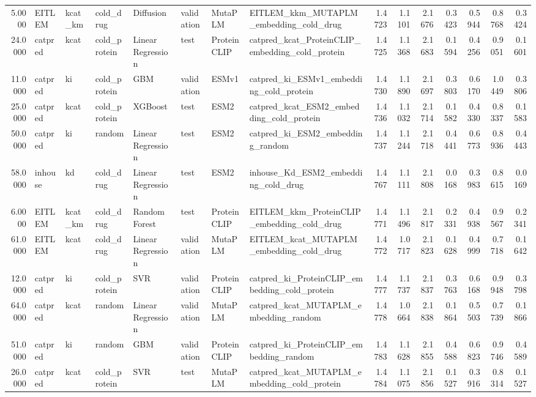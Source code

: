 \begin{tabular}{rlllllllrrrrrrr}
5.0000 & EITLEM & kcat_km & cold_drug & Diffusion & validation & MutaPLM & EITLEM_kkm_MUTAPLM_embedding_cold_drug & 1.4723 & 1.1101 & 2.1676 & 0.3423 & 0.5944 & 0.8768 & 0.3424 \\
24.0000 & catpred & kcat & cold_protein & Linear Regression & test & ProteinCLIP & catpred_kcat_ProteinCLIP_embedding_cold_protein & 1.4725 & 1.1368 & 2.1683 & 0.1594 & 0.4256 & 0.9051 & 0.1601 \\
11.0000 & catpred & ki & cold_protein & GBM & validation & ESMv1 & catpred_ki_ESMv1_embedding_cold_protein & 1.4730 & 1.1890 & 2.1697 & 0.3803 & 0.6170 & 1.0449 & 0.3806 \\
25.0000 & catpred & kcat & cold_protein & XGBoost & test & ESM2 & catpred_kcat_ESM2_embedding_cold_protein & 1.4736 & 1.1032 & 2.1714 & 0.1582 & 0.4330 & 0.8337 & 0.1583 \\
50.0000 & catpred & ki & random & Linear Regression & test & ESM2 & catpred_ki_ESM2_embedding_random & 1.4737 & 1.1244 & 2.1718 & 0.4441 & 0.6773 & 0.8936 & 0.4443 \\
58.0000 & inhouse & kd & cold_drug & Linear Regression & test & ESM2 & inhouse_Kd_ESM2_embedding_cold_drug & 1.4767 & 1.1111 & 2.1808 & 0.0168 & 0.3983 & 0.8615 & 0.0169 \\
6.0000 & EITLEM & kcat_km & cold_drug & Random Forest & test & ProteinCLIP & EITLEM_kkm_ProteinCLIP_embedding_cold_drug & 1.4771 & 1.1496 & 2.1817 & 0.2331 & 0.4938 & 0.9567 & 0.2341 \\
61.0000 & EITLEM & kcat & cold_drug & Linear Regression & validation & MutaPLM & EITLEM_kcat_MUTAPLM_embedding_cold_drug & 1.4772 & 1.0717 & 2.1823 & 0.1628 & 0.4999 & 0.7718 & 0.1642 \\
12.0000 & catpred & ki & cold_protein & SVR & validation & ProteinCLIP & catpred_ki_ProteinCLIP_embedding_cold_protein & 1.4777 & 1.1737 & 2.1837 & 0.3763 & 0.6168 & 0.9948 & 0.3798 \\
64.0000 & catpred & kcat & random & Linear Regression & validation & MutaPLM & catpred_kcat_MUTAPLM_embedding_random & 1.4778 & 1.0664 & 2.1838 & 0.1864 & 0.5503 & 0.7739 & 0.1866 \\
51.0000 & catpred & ki & random & GBM & validation & ProteinCLIP & catpred_ki_ProteinCLIP_embedding_random & 1.4783 & 1.1628 & 2.1855 & 0.4588 & 0.6823 & 0.9746 & 0.4589 \\
26.0000 & catpred & kcat & cold_protein & SVR & test & MutaPLM & catpred_kcat_MUTAPLM_embedding_cold_protein & 1.4784 & 1.1075 & 2.1856 & 0.1527 & 0.3916 & 0.8314 & 0.1527 \\

\end{tabular}
